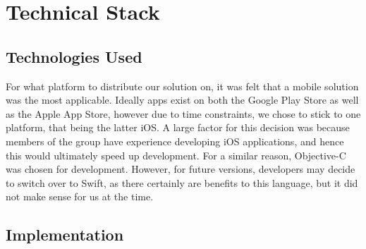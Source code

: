 \section{Technical Stack}
\subsection{Technologies Used}
For what platform to distribute our solution on, it was felt that a mobile solution was the most applicable. Ideally apps exist on both the Google Play Store as well as the Apple App Store, however due to time constraints, we chose to stick to one platform, that being the latter iOS. A large factor for this decision was because members of the group have experience developing iOS applications, and hence this would ultimately speed up development. For a similar reason, Objective-C was chosen for development. However, for future versions, developers may decide to switch over to Swift, as there certainly are benefits to this language, but it did not make sense for us at the time.
\subsection{Implementation}
